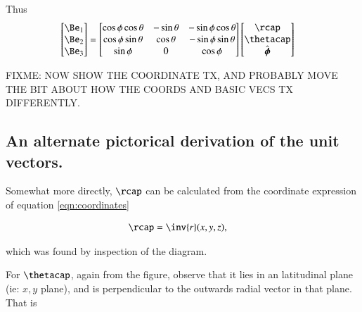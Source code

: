 \documentclass{article}
\newcommand{\phicap}[0]{\hat{\boldsymbol{\phi}}}
\begin{document}
Thus
\begin{align*}
\begin{bmatrix}
\Be_1 \\
\Be_2 \\
\Be_3 \\
\end{bmatrix}
&=
%
\begin{bmatrix}
\cos\phi \cos\theta & - \sin\theta & - \sin\phi \cos\theta \\
\cos\phi \sin\theta & \cos\theta & - \sin\phi \sin\theta  \\
\sin\phi & 0 & \cos\phi \\
\end{bmatrix}
\begin{bmatrix}
\rcap \\
\thetacap \\
\phicap \\
\end{bmatrix}
\end{align*}

FIXME: NOW SHOW THE COORDINATE TX, AND PROBABLY MOVE THE BIT ABOUT HOW THE
COORDS AND BASIC VECS TX DIFFERENTLY.  

\subsection{ An alternate pictorical derivation of the unit vectors. }

Somewhat more directly, $\rcap$ can be calculated from the coordinate expression of equation \ref{eqn:coordinates}

\begin{align*}
\rcap 
&= \inv{r} (x, y, z),
\end{align*}

which was found by inspection of the diagram.

For $\thetacap$, again from the figure, observe that it lies in an
latitudinal plane (ie: $x,y$ plane), and is perpendicular to the outwards radial vector in that plane.  That is
\end{document}
